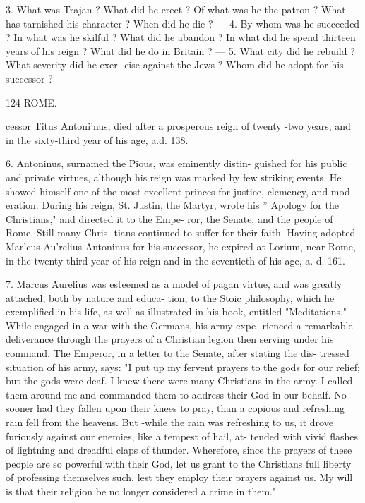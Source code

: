 \documentclass[openany,a4paper]{memoir}
\begin{document}
3. What was Trajan ? What did he erect ? Of what was he the patron ? 
What has tarnished his character ? When did he die ? — 4. By whom 
was he succeeded ? In what was he skilful ? What did he abandon ? 
In what did he spend thirteen years of his reign ? What did he do in 
Britain ? — 5. What city did he rebuild ? What severity did he exer- 
cise against the Jews ? Whom did he adopt for his successor ? 



124 ROME. 

cessor Titus Antoni'nus, died after a prosperous reign of 
twenty -two years, and in the sixty-third year of his age, a.d. 138. 

6. Antoninus, surnamed the Pious, was eminently distin- 
guished for his public and private virtues, although his reign 
was marked by few striking events. He showed himself one 
of the most excellent princes for justice, clemency, and mod- 
eration. During his reign, St. Justin, the Martyr, wrote his 
'' Apology for the Christians," and directed it to the Empe- 
ror, the Senate, and the people of Rome. Still many Chris- 
tians continued to suffer for their faith. Having adopted 
Mar'cus Au'relius Antoninus for his successor, he expired 
at Lorium, near Rome, in the twenty-third year of his reign 
and in the seventieth of his age, a. d. 161. 

7. Marcus Aurelius was esteemed as a model of pagan 
virtue, and was greatly attached, both by nature and educa- 
tion, to the Stoic philosophy, which he exemplified in his life, 
as well as illustrated in his book, entitled "Meditations." 
While engaged in a war with the Germans, his army expe- 
rienced a remarkable deliverance through the prayers of a 
Christian legion then serving under his command. The 
Emperor, in a letter to the Senate, after stating the dis- 
tressed situation of his army, says: "I put up my fervent 
prayers to the gods for our relief; but the gods were deaf. 
I knew there were many Christians in the army. I called 
them around me and commanded them to address their God 
in our behalf. No sooner had they fallen upon their knees 
to pray, than a copious and refreshing rain fell from the 
heavens. But -while the rain was refreshing to us, it drove 
furiously against our enemies, like a tempest of hail, at- 
tended with vivid flashes of lightning and dreadful claps of 
thunder. Wherefore, since the prayers of these people are 
so powerful with their God, let us grant to the Christians 
full liberty of professing themselves such, lest they employ 
their prayers against us. My will is that their religion be 
no longer considered a crime in them." 
\end{document}
